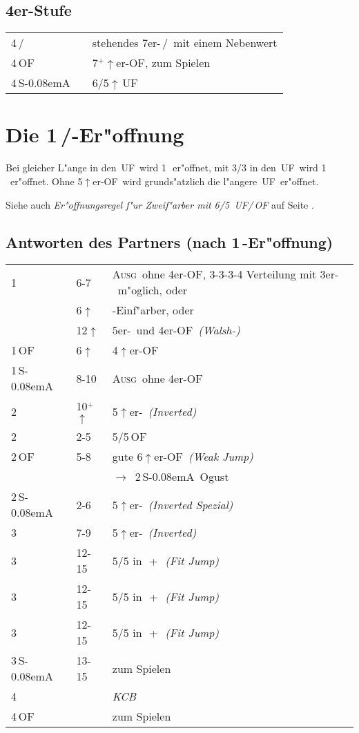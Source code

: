 \documentclass[11pt,german,twocolumn]{scrartcl}
\def\pik{\nobreak\,\Sp}
\def\coe{\nobreak\,\He}
\def\kar{\nobreak\,\Di}
\def\tre{\nobreak\,\Cl}
\def\ka{\Di}
\def\tr{\Cl}
\def\mi{\,\Cl /\Di}
\def\ma{\,\He /\Sp}
\def\good{$^+$}
\def\ra{$\rightarrow$}
\def\pl{$\uparrow$}
\def\uf{\nobreak\textsf{\,UF}}
\def\of{\nobreak\textsf{\,OF}}
\def\ofa{\nobreak\textsf{OF}}
\def\sa{\nobreak\textsf{S\kern-0.08emA}}
\def\SA{\nobreak\,\sa}
\newcommand{\conv}[1]{\emph{#1}}
\def\bal{\textsc{Ausg}}
\newcommand\bidins[1]%
{%
\begin{flushleft}
\begin{tabularx}{\columnwidth}{llX}%
#1
\end{tabularx}%
\end{flushleft}
}
\newcommand{\Index}[1]{#1\index{#1}}
\begin{document}
\subsection*{4er-Stufe}
\bidins{%
4\mi	& 	& stehendes 7er-\ma\ mit einem Nebenwert\\[1ex]
4\of	&	& 7\good\pl er-\ofa, zum Spielen\\[1ex]
4\SA	&	& 6/5\pl\uf
}

\section{Die 1\mi-Er"offnung}

Bei gleicher L"ange in den \uf\ wird 1\kar\ er"offnet, mit 3/3 in den \uf\
wird 1\tre\ er"offnet.
Ohne 5\pl er-\ofa\ wird grunds"atzlich die l"angere \uf\ er"offnet.

Siehe auch \textit{Er"offnungsregel f"ur Zweif"arber mit 6/5 \uf/\of} auf
Seite \pageref{zfregel}.

\subsection{Antworten des Partners (nach 1\tre-Er"offnung)}
\bidins{%
1\kar	& 6-7	& \bal\ ohne 4er-\ofa, 3-3-3-4 Verteilung mit 3er-\ka\ m"oglich, oder\\
	& 6\pl	& \ka-Einf"arber, oder\\
	& 12\pl	& 5er-\ka\ und 4er-\ofa\ \conv{(Walsh-\ka)}\\[1ex]
1\of	& 6\pl	& 4\pl er-\ofa\\[1ex]
1\SA	& 8-10	& \bal\ ohne 4er-\ofa\\[1ex]
2\tre	& 10\good\pl & 5\pl er-\tr\ \conv{(Inverted)}\\[1ex]
2\kar	& 2-5	& 5/5\of\\[1ex]
2\of	& 5-8	& gute 6\pl er-\ofa\ \conv{(Weak Jump)}\\
        &       & \ra\ 2\SA\ \Index{Ogust} \\[1ex]
2\SA    & 2-6   & 5\pl er-\tr\ \conv{(Inverted Spezial)}\\
3\tre	& 7-9	& 5\pl er-\tr\ \conv{(Inverted)}\\[1ex]
3\kar	& 12-15 & 5/5 in \tre\,+\kar\ \conv{(Fit Jump)}\\
3\coe	& 12-15 & 5/5 in \tre\,+\coe\ \conv{(Fit Jump)}\\
3\pik	& 12-15	& 5/5 in \tre\,+\pik\ \conv{(Fit Jump)}\\[1ex]
3\SA	& 13-15	& zum Spielen\\[1ex]
4\tre	&	& \conv{KCB}\\[1ex]
4\of	&	& zum Spielen
}
\end{document}

